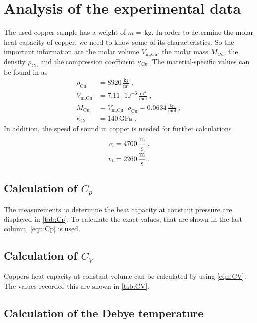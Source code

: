 \section{Analysis of the experimental data}
\label{sec:Auswertung}

%


The used copper sample has a weight of $m= \, \unit{\kilo \gram}$.
In order to determine the molar heat capacity of copper, we need to know some of its characteristics.
So the important information are the molar volume $V_{\text{m,Cu}}$, the molar mass $M_{\text{Cu}}$, the density $\rho_{\text{Cu}}$ and 
the compression coefficient $\kappa_{\text{Cu}}$. 
The material-specific values can be found in \cite{6} as
\begin{align*}
    \rho_{\text{Cu}}&= 8920\,  \frac{\unit{\kilo \gram}}{\unit{\meter}^3} \; , \\
    V_{\text{m,Cu}}&=7.11 \cdot 10^{-6}\, \frac{\unit{\meter}^3}{\text{mol}} \; ,\\
    M_{\text{Cu}}&= V_{\text{m,Cu}} \cdot \rho_{\text{Cu}}= 0.0634\, \frac{\unit{\kilo \gram}}{\text{mol}}\; ,\\
    \kappa_{\text{Cu}}&= 140\, \unit{\giga \pascal}\; .
\end{align*}
In addition, the speed of sound in copper \cite{ap47} is needed for further calculations
\begin{align*}
    v_{\text{l}}&=4700\, \unit{\frac{\meter}{\second}}\; ,\\
v_{\text{t}}&=2260\, \unit{\frac{\meter}{\second}} \; .
\end{align*}

\subsection{Calculation of $C_{p}$}
The measurements to determine the heat capacity at constant pressure are displayed in \autoref{tab:Cp}.
To calculate the exact values, that are shown in the last column, \autoref{eqn:Cp} is used. 


\subsection{Calculation of $C_{V}$}
Coppers heat capacity at constant volume can be calculated by using \autoref{eqn:CV}. The values recorded this are shown in \autoref{tab:CV}.


\subsection{Calculation of the Debye temperature}%

